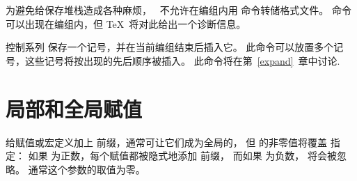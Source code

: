 \documentclass{book}
\begin{document}
为避免给保存堆栈造成各种麻烦，
\IniTeX\ 不允许在编组内用  命令转储格式文件。
 命令可以出现在编组内，但 \TeX\ 将对此给出一个诊断信息。

控制系列  保存一个记号，并在当前编组结束后插入它。
此命令可以放置多个记号，这些记号将按出现的先后顺序被插入。
此命令将在第~\ref{expand}~章中讨论.


\section{局部和全局赋值}
\label{global:assign}

给赋值或宏定义加上  前缀，通常可让它们成为全局的，
但   的非零值将覆盖 指定：
如果  为正数，每个赋值都被隐式地添加  前缀，
而如果  为负数， 将会被忽略。
通常这个参数的取值为零。
\end{document}
